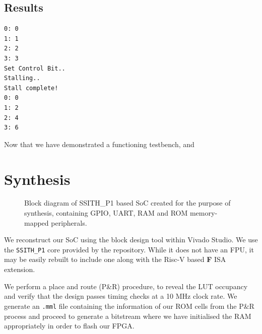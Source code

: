 \documentclass[a4paper,8pt]{report}
\begin{document}
\subsection{Results}
\begin{verbatim}
0: 0
1: 1
2: 2
3: 3
Set Control Bit..
Stalling..
Stall complete!
0: 0
1: 2
2: 4
3: 6
\end{verbatim}

Now that we have demonstrated a functioning testbench, and 

\clearpage
\section{Synthesis}
\begin{figure}[b]
  \centering
  \caption{Block diagram of SSITH\_P1 based SoC created for the purpose of
    synthesis, containing GPIO, UART, RAM and ROM memory-mapped peripherals.}
\end{figure}
We reconstruct our SoC using the block design tool within Vivado Studio. We use
the \texttt{SSITH\_P1} core provided by the repository. While it does not have
an FPU, it may be easily rebuilt to include one along with the Risc-V based
\textbf{F} ISA extension.

We perform a place and route (P\&R) procedure, to reveal the LUT occupancy and verify
that the design passes timing checks at a 10 MHz clock rate. We generate an \texttt{.mml}
file containing the information of our ROM cells from the P\&R process and
proceed to generate a bitstream where we have initialised the RAM appropriately
in order to flash our FPGA.
\end{document}
